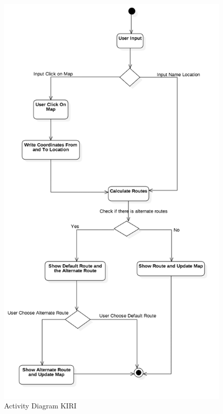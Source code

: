 \begin{figure}[H]
	\centering
	\includegraphics[scale=0.5]{Gambar/activitydiagram}
	\caption{Activity Diagram KIRI} 
	\label{fig:3_activitydiagram}
\end{figure}